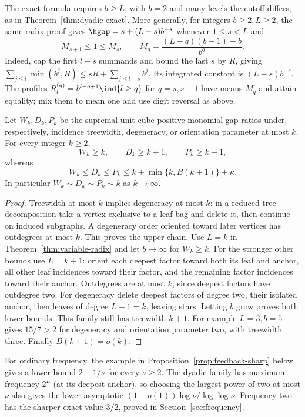 The exact formula requires $b\ge L$; with $b=2$ and many levels the
cutoff differs, as in Theorem~\ref{thm:dyadic-exact}. More generally, for
integers $b\ge2,L\ge2$, the same radix proof gives
$\hgap=s+(L-s)b^{-s}$ whenever $1\le s<L$ and
\[
 M_{s+1}\le1\le M_s,\qquad
 M_q=\frac{(L-q)(b-1)+b}{b^q}.
\]
Indeed, cap the first $l-s$ summands and bound the last $s$ by $R$, giving
$\sum_{j\le l}\min(b^j,R)\le sR+\sum_{j\le l-s}b^j$.
Its integrated constant is $(L-s)b^{-s}$. The profiles
$R_l^{(q)}=b^{l-q+1}\ind\{l\ge q\}$ for $q=s,s+1$ have means $M_q$
and attain equality; mix them to mean one and use digit reversal as above.

\begin{corollary}\label{cor:structural-growth}
Let $W_k,D_k,P_k$ be the supremal unit-cube positive-monomial gap ratios
under, respectively, incidence treewidth, degeneracy, or orientation
parameter at most $k$. For every integer $k\ge2$,
\[
 W_k\ge k,\qquad D_k\ge k+1,\qquad P_k\ge k+1,
\]
whereas
\[
 W_k\le D_k\le P_k\le k+\min\{k,B(k+1)\}+\kappa.
\]
In particular $W_k\sim D_k\sim P_k\sim k$ as $k\to\infty$.
\end{corollary}
\begin{proof}
Treewidth at most $k$ implies degeneracy at most $k$: in a reduced tree
decomposition take a vertex exclusive to a leaf bag and delete it,
then continue on induced subgraphs. A degeneracy order oriented toward
later vertices has outdegrees at most $k$. This proves the upper chain.
Use $L=k$ in Theorem~\ref{thm:variable-radix} and let $b\to\infty$ for
$W_k\ge k$. For the stronger other bounds use $L=k+1$: orient each
deepest factor toward both its leaf and anchor, all other leaf incidences
toward their factor, and the remaining factor incidences toward their
anchor. Outdegrees are at most $k$, since deepest factors have outdegree
two. For degeneracy delete deepest factors of degree two, their isolated
anchor, then leaves of degree $L-1=k$, leaving stars. Letting $b$ grow
proves both lower bounds. This family still has treewidth $k+1$.
For example $L=3,b=5$ gives $15/7>2$ for degeneracy and orientation
parameter two, with treewidth three. Finally $B(k+1)=o(k)$.
\end{proof}

For ordinary frequency, the example in Proposition~\ref{prop:feedback-sharp}
below gives a lower bound $2-1/\nu$ for every $\nu\ge2$.
The dyadic family has maximum frequency $2^L$ (at its deepest anchor), so
choosing the largest power of two at most $\nu$ also gives the lower
asymptotic $(1-o(1))\log\nu/\log\log\nu$. Frequency two has the sharper
exact value $3/2$, proved in Section~\ref{sec:frequency}.

